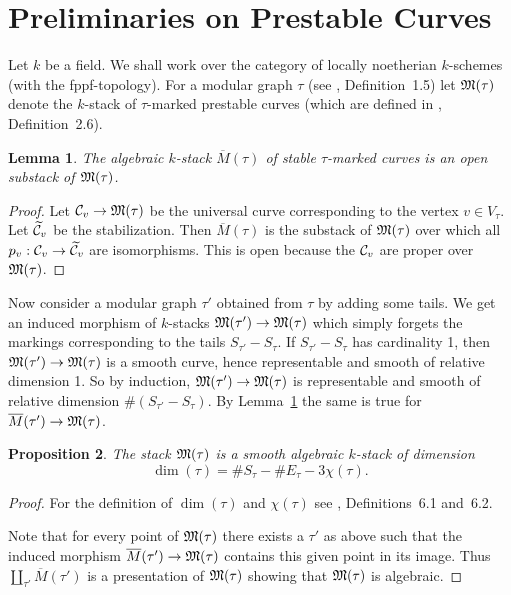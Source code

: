 \documentclass{article}
\newtheorem{prop}{Proposition}
\newtheorem{lem}[prop]{Lemma}
\renewcommand{\tilde}{\widetilde}
\newcommand{\MM}{{\frak M}}
\newcommand{\cC}{{\cal C}}
\newcommand{\ol}{\overline}
\begin{document}
\section{Preliminaries on Prestable Curves}

Let $k$ be a field. We shall work over the category of locally noetherian
$k$-schemes (with the fppf-topology). For a modular graph $\tau$ (see
\cite{BM},
Definition~1.5) let $\MM(\tau)$ denote the $k$-stack of $\tau$-marked prestable
curves (which are defined in \cite{BM}, Definition~2.6).

\begin{lem}\label{soss}
The algebraic $k$-stack $\ol{M}(\tau)$ of stable $\tau$-marked curves
is an open substack of $\MM(\tau)$.
\end{lem}
\begin{proof}
Let $\cC_v\rightarrow\MM(\tau)$ be the universal curve
corresponding to the vertex $v\in V_{\tau}$. Let $\tilde{\cC}_v$ be
the stabilization. Then $\ol{M}(\tau)$ is the substack of $\MM(\tau)$
over which all $p_v:\cC_v\to\tilde{\cC}_v$ are isomorphisms. This is
open because the $\cC_v$ are proper over $\MM(\tau)$.
\end{proof}

Now consider a modular graph $\tau'$ obtained from $\tau$ by adding
some tails. We get an induced morphism of $k$-stacks
$\MM(\tau')\to\MM(\tau)$ which simply forgets the markings
corresponding to the tails $S_{\tau'}-S_{\tau}$. If
$S_{\tau'}-S_{\tau}$ has cardinality 1, then
$\MM(\tau')\rightarrow\MM(\tau)$ is a smooth
curve, hence representable and smooth of relative dimension 1. So by
induction, $\MM(\tau')\to\MM(\tau)$ is representable and smooth of
relative dimension $\#(S_{\tau'}-S_{\tau})$. By Lemma~\ref{soss} the
same is true for $\ol{M}(\tau')\to\MM(\tau)$.

\begin{prop}  The stack $\MM(\tau)$ is a smooth algebraic $k$-stack of
dimension
\[\dim(\tau)=\#S_{\tau}-\#E_{\tau}-3\chi(\tau).\]
\end{prop}
\begin{proof} For the definition of $\dim(\tau)$ and $\chi(\tau)$ see \cite{BM},
Definitions~6.1 and~6.2.

Note that for every point of $\MM(\tau)$ there exists a $\tau'$ as
above such that the induced morphism $\ol{M}(\tau')\to\MM(\tau)$
contains this given point in its image. Thus
$\coprod_{\tau'}\ol{M}(\tau')$ is a presentation of $\MM(\tau)$
showing that $\MM(\tau)$ is algebraic.
\end{proof}
\end{document}
